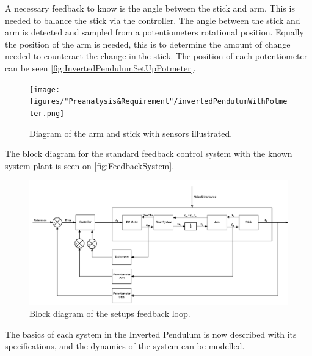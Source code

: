 A necessary feedback to know is the angle between the stick and arm. This is needed to balance the stick via the controller. The angle between the stick and arm is detected and sampled from a potentiometers rotational position. Equally the position of the arm is needed, this is to determine the amount of change needed to counteract the change in the stick. The position of each potentiometer can be seen \autoref{fig:InvertedPendulumSetUpPotmeter}. 

\begin{figure} [htbp]
	\centering
	\texttt{[image: figures/"Preanalysis\&Requirement"/invertedPendulumWithPotmeter.png]}
	\caption{Diagram of the arm and stick with sensors illustrated.} \label{fig:InvertedPendulumSetUpPotmeter}
\end{figure}
\newpage
The block diagram for the standard feedback control system with the known system plant is seen on \autoref{fig:FeedbackSystem}. 

\begin{figure}[htbp]
\hspace*{-2.5 cm} 
	\centering
	\includegraphics[width=\textwidth]{figures/modeling/MechanicalSystem}
	\caption{Block diagram of the setups feedback loop.} \label{fig:FeedbackSystem}
\end{figure}

The basics of each system in the Inverted Pendulum is now described with its specifications, and the dynamics of the system can be modelled.

\newpage
